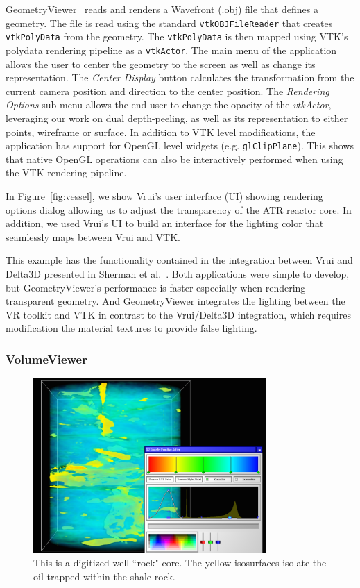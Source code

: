 GeometryViewer~\cite{GeometryViewer} reads and renders a Wavefront (.obj) file that defines a geometry.
The file is read using the standard \texttt{vtkOBJFileReader} that creates \texttt{vtkPolyData} from the geometry.
The \texttt{vtkPolyData} is then mapped using VTK's polydata rendering pipeline as a \texttt{vtkActor}.
The main menu of the application allows the user to center the geometry to the screen as well as change its representation.
The \textit{Center Display} button calculates the transformation from the current camera position and direction to the center position.
The \textit{Rendering Options} sub-menu allows the end-user to change the opacity of the \textit{vtkActor}, leveraging our work on dual depth-peeling, as well as its representation to either points, wireframe or surface.
In addition to VTK level modifications, the application has support for OpenGL level widgets (e.g. \texttt{glClipPlane}).
This shows that native OpenGL operations can also be interactively performed when using the VTK rendering pipeline.

In Figure~\ref{fig:vessel}, we show Vrui's user interface (UI) showing rendering options dialog allowing us to adjust the transparency of the ATR reactor core. In addition, we used Vrui's UI to build an interface for the lighting color that seamlessly maps between Vrui and VTK.

This example has the functionality contained in the integration between Vrui and Delta3D presented in Sherman et al.~\cite{Sherman:2010}. Both applications were simple to develop, but GeometryViewer's  performance is faster especially when rendering transparent geometry. And GeometryViewer integrates the lighting between the VR toolkit and VTK in contrast to the Vrui/Delta3D integration, which requires modification the material textures to provide false lighting.

\subsubsection{VolumeViewer}

\begin{figure}[h!]
 \centering
 \includegraphics[width=3.5in]{images/rock-transferfunction.png}
 \caption{This is a digitized well ``rock" core. The yellow isosurfaces isolate the oil trapped within the shale rock.}
 \label{fig:volume}
\end{figure}

